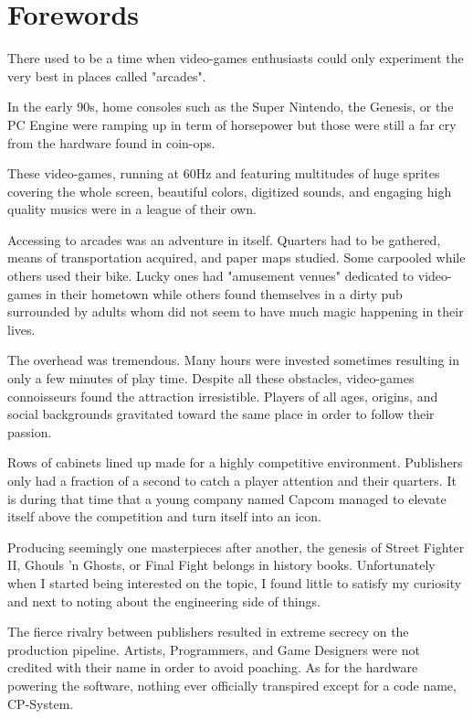 \chapter*{Forewords}

There used to be a time when video-games enthusiasts could only experiment the very best in places called "arcades". 

In the early 90s, home consoles such as the Super Nintendo, the Genesis, or the PC Engine were ramping up in term of horsepower but those were still a far cry from the hardware found in coin-ops.

These video-games, running at 60Hz and featuring multitudes of huge sprites covering the whole screen, beautiful colors, digitized sounds, and engaging high quality musics were in a league of their own.

Accessing to arcades was an adventure in itself. Quarters had to be gathered, means of transportation acquired, and paper maps studied. Some carpooled while others used their bike. Lucky ones had "amusement venues" dedicated to video-games in their hometown while others found themselves in a dirty pub surrounded by adults whom did not seem to have much magic happening in their lives. 

The overhead was tremendous. Many hours were invested sometimes resulting in only a few minutes of play time. Despite all these obstacles, video-games connoisseurs found the attraction irresistible. Players of all ages, origins, and social backgrounds gravitated toward the same place in order to follow their passion. 

Rows of cabinets lined up made for a highly competitive environment. Publishers only had a fraction of a second to catch a player attention and their quarters. It is during that time that a young company named Capcom  managed to elevate itself above the competition and turn itself into an icon.

Producing seemingly one masterpieces after another, the genesis of Street Fighter II, Ghouls 'n Ghosts, or Final Fight belongs in history books. Unfortunately when I started being interested on the topic, I found little to satisfy my curiosity and next to noting about the engineering side of things. 

The fierce rivalry between publishers resulted in extreme secrecy on the production pipeline. Artists, Programmers, and Game Designers were not credited with their name in order to avoid poaching. As for the hardware powering the software, nothing ever officially transpired except for a code name, CP-System.

